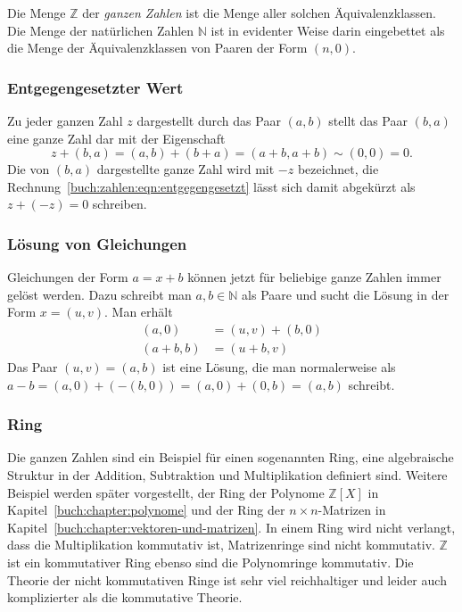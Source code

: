 Die Menge $\mathbb{Z}$ der {\em ganzen Zahlen} ist die Menge aller solchen
Äquivalenzklassen.
Die Menge der natürlichen Zahlen $\mathbb{N}$ ist in evidenter Weise
darin eingebettet als die Menge der Äquivalenzklassen von Paaren der
Form $(n,0)$.

\subsubsection{Entgegengesetzter Wert}
Zu jeder ganzen Zahl $z$ dargestellt durch das Paar $(a,b)$ 
stellt das Paar $(b,a)$ eine ganze Zahl dar mit der Eigenschaft
\begin{equation}
z+(b,a)
=
(a,b) + (b+a) = (a+b,a+b) \sim (0,0) = 0.
\label{buch:zahlen:eqn:entgegengesetzt}
\end{equation}
Die von $(b,a)$ dargestellte ganze Zahl wird mit $-z$ bezeichnet,
die Rechnung~\eqref{buch:zahlen:eqn:entgegengesetzt} lässt sich damit
abgekürzt als $z+(-z)=0$ schreiben.

\subsubsection{Lösung von Gleichungen}
Gleichungen der Form $a=x+b$ können jetzt für beliebige ganze Zahlen
immer gelöst werden.
Dazu schreibt man $a,b\in\mathbb{N}$ als Paare und sucht die
Lösung in der Form $x=(u,v)$.
Man erhält
\begin{align*}
(a,0) &= (u,v) + (b,0)
\\
(a+b,b) &= (u+b,v)
\end{align*}
Das Paar $(u,v) = (a,b)$ ist eine Lösung, die man normalerweise als
$a-b = (a,0) + (-(b,0)) = (a,0) + (0,b) = (a,b)$ schreibt.

\subsubsection{Ring}
%
Die ganzen Zahlen sind ein Beispiel für einen sogenannten Ring,
eine algebraische Struktur in der Addition, Subtraktion und
Multiplikation definiert sind.
Weitere Beispiel werden später vorgestellt,
der Ring der Polynome $\mathbb{Z}[X]$ in Kapitel~\ref{buch:chapter:polynome}
und
der Ring der $n\times n$-Matrizen in
Kapitel~\ref{buch:chapter:vektoren-und-matrizen}.
In einem Ring wird nicht verlangt, dass die Multiplikation kommutativ
ist, Matrizenringe sind nicht kommutativ.
$\mathbb{Z}$ ist ein kommutativer Ring ebenso sind die Polynomringe 
kommutativ.
Die Theorie der nicht kommutativen Ringe ist sehr viel reichhaltiger
und leider auch komplizierter als die kommutative Theorie.
%





